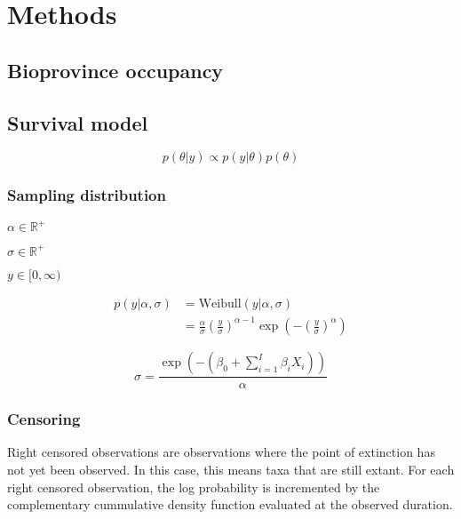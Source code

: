 \documentclass[12pt,letterpaper]{article}
\begin{document}
\section{Methods}

\subsection{Bioprovince occupancy}


\subsection{Survival model}

\begin{equation}
  p(\theta|y) \propto p(y|\theta) p(\theta)
  \label{eq:bayes}
\end{equation}

\subsubsection{Sampling distribution}

\(\alpha \in \mathbb{R}^{+}\)

\(\sigma \in \mathbb{R}^{+}\)

\(y \in [0, \infty)\)

\begin{align}
  p(y|\alpha, \sigma) &= \mathrm{Weibull}(y|\alpha, \sigma) \nonumber \\ 
  &= \frac{\alpha}{\sigma} \left(\frac{y}{\sigma}\right)^{\alpha - 1} \exp\left(-\left(\frac{y}{\sigma}\right)^{\alpha}\right)
  \label{eq:weibull}
\end{align}


\begin{equation}
  \sigma = \frac{\exp(-(\beta_{0} + \sum_{i = 1}^{I} \beta_{i} X_{i}))}{\alpha}
  \label{eq:reg}
\end{equation}


\subsubsection{Censoring}


Right censored observations are observations where the point of extinction has not yet been observed. In this case, this means taxa that are still extant. For each right censored observation, the log probability is incremented by the complementary cummulative density function evaluated at the observed duration.
\end{document}
